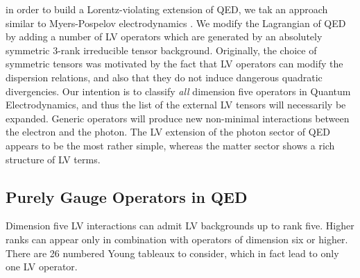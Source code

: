 \documentclass[12pt,preprintnumbers,nofootinbib]{revtex4}
\begin{document}
	in order to build a Lorentz-violating extension of QED, we tak an approach
	similar to Myers-Pospelov electrodynamics
\cite{MP:}.
	We modify the Lagrangian of QED by adding
	a number of LV operators which are generated by an absolutely
	symmetric 3-rank irreducible tensor background.
	Originally, the choice of symmetric tensors was motivated by the fact that
	LV operators can modify the dispersion relations, and also that
	they do not induce dangerous quadratic divergencies.
Our intention is to classify {\it all} dimension five operators in 
	Quantum Electrodynamics, and thus the list of the external LV tensors will 
necessarily be expanded. 
	Generic operators will produce new non-minimal interactions between
	the electron and the photon. 
	The LV extension of the photon sector of QED appears to be the most rather simple, whereas
	the matter sector shows a rich structure of LV terms.

\subsection{Purely Gauge Operators in QED}

	Dimension five LV interactions can admit LV backgrounds up to rank five.
	Higher ranks can appear only in combination with operators of dimension six or higher.
	There are 26 numbered Young tableaux to consider, which in fact 
	lead to only one LV operator.
\end{document}
